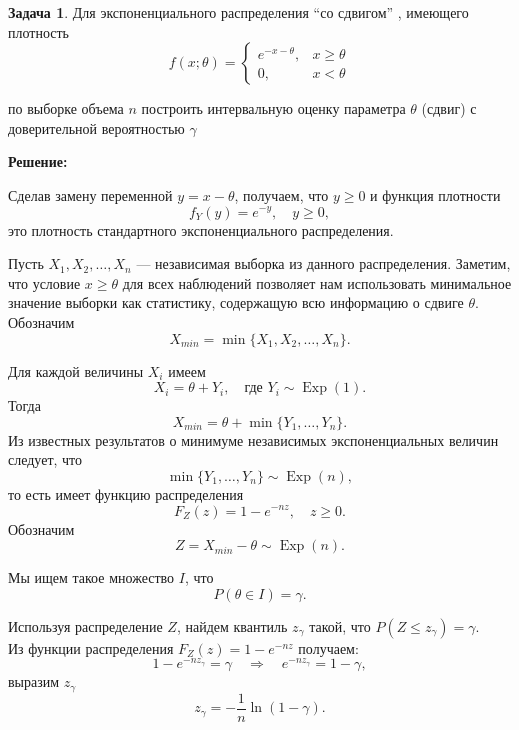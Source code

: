 \documentclass[a4paper,11pt]{article}
\newenvironment{shdd}{\begin{mdframed}[backgroundcolor=shadecolor]}{\end{mdframed}}
\theoremstyle{definition}
\newtheorem{problem}{Задача}\setlength{\parindent}{0pt}
\newenvironment{solution}
{\begin{shdd}\textbf{Решение:}\par\setlength{\parindent}{0pt}}
{\end{shdd}}
\begin{document}
\vspace{10pt}
\begin{problem}
    Для экспоненциального распределения “со сдвигом” , имеющего плотность
    \begin{equation}
        f(x; \theta) = 
        \begin{cases}
            e^{-x-\theta}, & x\geq\theta \\
            0, &x<\theta
        \end{cases}
    \end{equation}
    
    по выборке объема \(n\) построить интервальную оценку параметра \(\theta\) (сдвиг) с доверительной
    вероятностью \(\gamma\)
    \begin{solution}
        Сделав замену переменной \(y=x-\theta\), получаем, что \(y\ge0\) и функция плотности
        \[
        f_Y(y)= e^{-y},\quad y \ge 0,
        \]
        это плотность стандартного экспоненциального распределения. 
    
        Пусть \(X_1, X_2, \dots, X_n\) — независимая выборка из данного распределения. Заметим, что условие \(x \ge \theta\) 
        для всех наблюдений позволяет нам использовать минимальное значение выборки как статистику, содержащую всю информацию 
        о сдвиге \(\theta\). Обозначим
        \[
        X_{min} = \min\{X_1, X_2, \dots, X_n\}.
        \]
    
        Для каждой величины \(X_i\) имеем
        \[
        X_i = \theta + Y_i,\quad \text{где } Y_i\sim \operatorname{Exp}(1).
        \]
        Тогда
        \[
        X_{min} = \theta + \min\{Y_1, \dots, Y_n\}.
        \]
        Из известных результатов о минимуме независимых экспоненциальных величин следует, что
        \[
        \min\{Y_1, \dots, Y_n\} \sim \operatorname{Exp}(n),
        \]
        то есть имеет функцию распределения
        \[
        F_Z(z) = 1 - e^{-nz},\quad z \ge 0.
        \]
        Обозначим
        \[
        Z = X_{min} - \theta \sim \operatorname{Exp}(n).
        \]
    
        Мы ищем такое множество \(I\), что
        \[
        P(\theta \in I) = \gamma.
        \]
        
        Используя распределение \(Z\), найдем квантиль \(z_\gamma\) такой, что \(P(Z \le z_\gamma) = \gamma\).
        \\Из функции распределения \(F_Z(z)=1-e^{-nz}\) получаем:
        \[
        1-e^{-nz_\gamma}=\gamma \quad \Rightarrow \quad e^{-nz_\gamma}=1-\gamma,
        \]
        выразим \(z_{\gamma}\)
        \[
        z_\gamma=-\frac{1}{n}\ln(1-\gamma).
        \]
    

\end{solution}
\end{problem}
\end{document}

